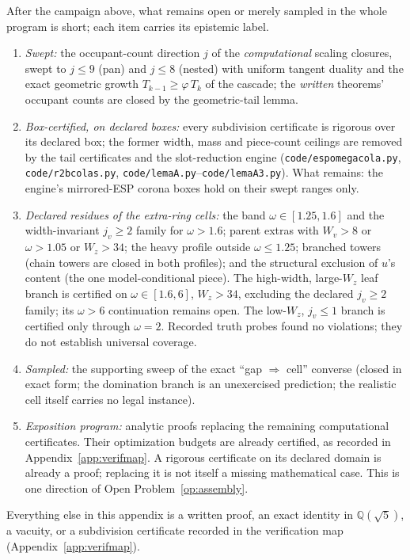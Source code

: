 \documentclass[11pt]{article}
\theoremstyle{definition}
\begin{document}
After the campaign above, what remains open or merely sampled in
the whole program is short; each item carries its epistemic label.
\begin{enumerate}
\item[(i)] \emph{Swept:} the occupant-count direction $j$ of the
\emph{computational} scaling closures, swept to $j\le9$ (pan) and
$j\le8$ (nested) with uniform tangent duality and the exact
geometric growth $T_{k-1}\ge\varphi\,T_k$ of the cascade; the
\emph{written} theorems' occupant counts are closed by the
geometric-tail lemma.
\item[(ii)] \emph{Box-certified, on declared boxes:} every
subdivision certificate is rigorous over its declared box; the
former width, mass and piece-count ceilings are removed by the
tail certificates and the slot-reduction engine
(\texttt{code/espomegacola.py}, \texttt{code/r2bcolas.py},
\texttt{code/lemaA.py}--\texttt{code/lemaA3.py}). What remains:
the engine's mirrored-ESP corona boxes hold on their swept ranges
only.
\item[(iii)] \emph{Declared residues of the extra-ring cells:}
the band $\omega\in[1.25,1.6]$ and the width-invariant
$j_v\ge2$ family for $\omega>1.6$; parent extras with $W_v>8$ or
$\omega>1.05$ or $W_z>34$; the heavy profile outside
$\omega\le1.25$; branched towers (chain towers are closed in
both profiles); and the structural exclusion of $u$'s content (the
one model-conditional piece). The high-width, large-$W_z$ leaf
branch is certified on $\omega\in[1.6,6]$, $W_z>34$, excluding
the declared $j_v\ge2$ family; its $\omega>6$ continuation remains
open. The low-$W_z$, $j_v\le1$ branch is certified only through
$\omega=2$. Recorded truth probes found no violations; they do
not establish universal coverage.
\item[(iv)] \emph{Sampled:} the supporting sweep of the exact
``gap $\Rightarrow$ cell'' converse (closed in exact form;
the domination branch is an unexercised prediction; the realistic
cell itself carries no legal instance).
\item[(v)] \emph{Exposition program:} analytic proofs replacing the
remaining computational certificates. Their optimization budgets
are already certified, as recorded in Appendix~\ref{app:verifmap}.
A rigorous certificate on its
declared domain is already a proof; replacing it is not itself a
missing mathematical case. This is one direction of Open
Problem~\ref{op:assembly}.
\end{enumerate}
Everything else in this appendix is a written proof, an exact
identity in $\mathbb{Q}(\sqrt5)$, a vacuity, or a subdivision
certificate recorded in the verification map
(Appendix~\ref{app:verifmap}).
\end{document}
